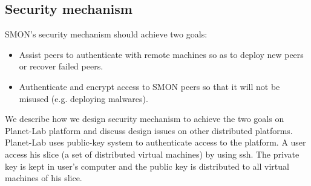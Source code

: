 



\subsection{Security mechanism}
\label{subsec:security}

SMON's security mechanism should achieve two goals:

\begin{itemize}

  \item Assist peers to authenticate with remote machines so
  as to deploy new peers or recover failed peers.

  \item Authenticate and encrypt access to SMON peers so
  that it will not be misused (e.g. deploying malwares).

\end{itemize}


We describe how we design security mechanism to achieve the
two goals on Planet-Lab platform and discuss design issues
on other distributed platforms. Planet-Lab uses public-key
system to authenticate access to the platform. A user access
his slice (a set of distributed virtual machines) by using
ssh. The private key is kept in user's computer and the
public key is distributed to all virtual machines of his
slice.


